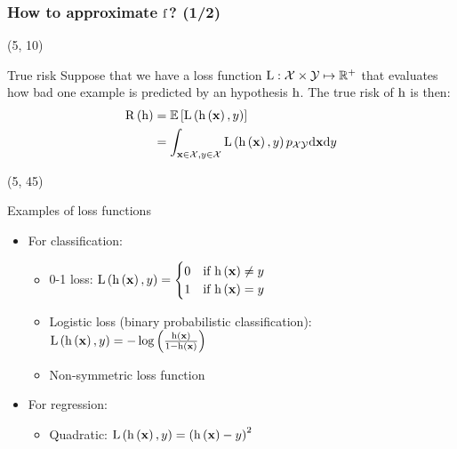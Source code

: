 \begin{frame}
  \frametitle{How to approximate $\mathrm{f}$? (1/2)}

  \begin{textblock}{90}(5, 10)
    \begin{block}{True risk}
      Suppose that we have a loss function $\mathrm{L}: \mathcal{X} \times \mathcal{Y} \mapsto
      \mathbb{R}^+$ that evaluates how bad one example is predicted by an hypothesis $\mathrm{h}$.
      The true risk of $\mathrm{h}$ is then:
      \begin{equation*}
        \begin{split}
          \mathrm{R} \left ( {\mathrm{h}} \right ) & = \mathrm{\mathbb{E}} \left [ {\mathrm{L} \left ( {\mathrm{h} \left ( {\mathbf{x}} \right ), y} \right )} \right ]\\
                              & = \int_{\mathbf{x} \in \mathcal{X}, y \in \mathcal{X}}
          \mathrm{L} \left ( {\mathrm{h} \left ( {\mathbf{x}} \right ), y} \right ) p_{\mathcal{X} \mathcal{Y}} \mathrm{d} \mathbf{x} \mathrm{d} y
        \end{split}
      \end{equation*}
    \end{block}
\end{textblock}

  \begin{textblock}{90}(5, 45)
    \begin{block}{Examples of loss functions}
      \begin{itemize}
      \item For classification:
        \begin{itemize}
        \item 0-1 loss:
          $\mathrm{L} \left ( {\mathrm{h} \left ( {\mathbf{x}} \right ), y} \right ) =
          \begin{cases}
            0 & \text{if $\mathrm{h} \left ( {\mathbf{x}} \right ) \ne y$} \\
            1 & \text{if $\mathrm{h} \left ( {\mathbf{x}} \right )  =  y$}
          \end{cases}
          $
        \item Logistic loss (binary probabilistic classification): $\mathrm{L} \left ( {\mathrm{h} \left ( {\mathbf{x}} \right ),
            y} \right ) =
          -\log \left ( {\frac{\mathrm{h} \left ( {\mathbf{x}} \right )}{1-\mathrm{h} \left ( {\mathbf{x}} \right )}} \right )$
        \item Non-symmetric loss function
        \end{itemize}
      \item For regression:
        \begin{itemize}
        \item Quadratic: $\mathrm{L} \left ( {\mathrm{h} \left ( {\mathbf{x}} \right ), y} \right )
          = \left( \mathrm{h} \left ( {\mathbf{x}} \right ) - y \right)^2$
        \end{itemize}
      \end{itemize}
    \end{block}
  \end{textblock}
\end{frame}


